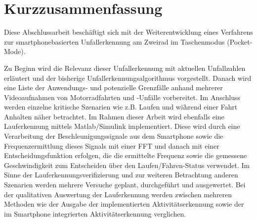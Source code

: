 \chapter*{Kurzzusammenfassung}
%
%
%
%
%
%
%
%
%
%
%
%

Diese Abschlussarbeit beschäftigt sich mit der Weiterentwicklung eines Verfahrens zur smartphonebasierten Unfallerkennung am Zweirad im Taschenmodus (Pocket-Mode). 

Zu Beginn wird die Relevanz dieser Unfallerkennung mit aktuellen Unfall\-zahlen er\-läut\-ert und der bisherige Unfallerkennungsalgorithmus vorgestellt.
Danach wird eine Liste der Anwendungs- und potenzielle Grenzfälle anhand mehrerer Videoaufnahmen von Motorradfahrten und -Unfälle vorbereitet. Im Anschluss werden einzelne kritische Szenarien wie z.B. Laufen und während einer Fahrt Anhalten näher betrachtet.
Im Rahmen dieser Arbeit wird ebenfalls eine Lauferkennung mittels Matlab/Simulink implementiert. Diese wird durch eine Verarbeitung der Beschleunigungssignale aus dem Smartphone sowie die Frequenzermittlung dieses Signals mit einer FFT und danach mit einer Entscheidungsfunktion erfolgen, die die ermittelte Frequenz sowie die gemessene Geschwindigkeit zum Entscheiden über den Laufen/Fahren-Status verwendet.
Im Sinne der Lauferkennungsverifizierung und zur weiteren Betrachtung anderen Szenarien werden mehrere Versuche geplant, durchgeführt und ausgewertet.
Bei der qualitativen Auswertung der Lauferkennung werden zwischen mehreren Methoden wie der Ausgabe der implementierten Aktivitätserkennung sowie der im Smartphone integrierten Aktivitätserkennung verglichen. 
%
%
\begingroup %
\let\cleardoublepage\relax
